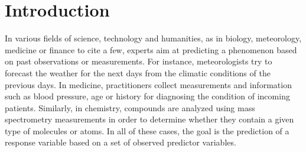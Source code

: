 \chapter{Introduction}\label{ch:introduction}

In various fields of science, technology and humanities, as in biology,
meteorology, medicine or finance to cite a few, experts aim at predicting a
phenomenon based on past observations or measurements. For instance,
meteorologists try to forecast the weather for the next days from the climatic
conditions of the previous days. In medicine, practitioners collect measurements
and information such as blood pressure, age or history for diagnosing the
condition of incoming patients. Similarly, in chemistry, compounds are analyzed
using mass spectrometry measurements in order to determine whether they contain
a given type of molecules or atoms. In all of these cases, the goal is the
prediction of a response variable based on a set of observed predictor
variables.

